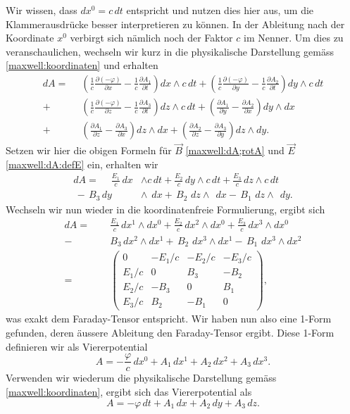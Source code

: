 Wir wissen, dass $dx^0 = c\,dt$ entspricht und nutzen dies hier aus, um die Klammerausdrücke besser interpretieren zu können.
In der Ableitung nach der Koordinate $x^0$ verbirgt sich nämlich noch der Faktor $c$ im Nenner.
Um dies zu veranschaulichen, wechseln wir kurz in die physikalische Darstellung gemäss \eqref{maxwell:koordinaten} und erhalten
\begin{align*}
	dA = \phantom{\frac{1}{c}}
	& \left(\frac{1}{c}\frac{\partial (-\varphi)}{\partial x}-\frac{1}{c}\frac{\partial A_1}{\partial t}\right) dx \wedge c\,dt 
	+ \left(\frac{1}{c}\frac{\partial (-\varphi)}{\partial y}-\frac{1}{c}\frac{\partial A_2}{\partial t}\right) dy \wedge c\,dt 
	\\
	+ &\left(\frac{1}{c}\frac{\partial (-\varphi)}{\partial z}-\frac{1}{c}\frac{\partial A_3}{\partial t}\right) dz \wedge c\,dt
	+ \left(\frac{\partial A_1}{\partial y}-\frac{\partial A_2}{\partial x}\right) dy \wedge dx 
	\\
	+ &\left(\frac{\partial A_1}{\partial z}-\frac{\partial A_3}{\partial x}\right) dz \wedge dx 
	+ \left(\frac{\partial A_2}{\partial z}-\frac{\partial A_3}{\partial y}\right) dz \wedge dy.
\end{align*}
Setzen wir hier die obigen Formeln für $\vec{B}$ \eqref{maxwell:dA;rotA} und $\vec{E}$ \eqref{maxwell:dA:defE} ein, erhalten wir
\begin{align*}
	dA = \phantom{+}
	\frac{E_1}{c} \,dx &\wedge c\,dt +
	\frac{E_2}{c} \,dy \wedge c\,dt +
	\frac{E_3}{c} \,dz \wedge c\,dt
	\\
	\, - \, B_3 \, dy &\wedge \phantom{c}dx +
	\, B_2 \,  \, dz \wedge \phantom{c} dx -
	\, B_1 \, \, dz \wedge \phantom{c} dy.
\end{align*}
Wechseln wir nun wieder in die koordinatenfreie Formulierung, ergibt sich
\begin{align*}
	dA = \phantom{+}
	& \frac{E_1}{c} \,dx^1 \wedge dx^0 +
	\frac{E_2}{c} \,dx^2 \wedge dx^0 +
	\frac{E_3}{c} \,dx^3 \wedge dx^0
	\\
	- \, &B_3 \, dx^2 \wedge dx^1 +
	\, B_2 \, \, dx^3 \wedge dx^1 -
	\, B_1 \, \, dx^3 \wedge dx^2
	\\[2ex] 
	= \quad 
	&\begin{pmatrix}
		0 & -E_1/c & -E_2/c & -E_3/c \\ E_1/c & 0 & B_3 & -B_2 \\ E_2/c & -B_3 & 0 & B_1 \\ E_3/c & B_2 & -B_1 & 0 
	\end{pmatrix},
\end{align*}
was exakt dem Faraday-Tensor entspricht.
Wir haben nun also eine 1-Form gefunden, deren äussere Ableitung den Faraday-Tensor ergibt.
Diese 1-Form definieren wir als Viererpotential
\begin{equation}
	A = -\frac{\varphi}{c}\,dx^0 + A_1 \,dx^1 + A_2 \,dx^2 + A_3 \,dx^3.
\end{equation}
Verwenden wir wiederum die physikalische Darstellung gemäss \eqref{maxwell:koordinaten},
ergibt sich das Viererpotential als
\begin{equation}
	A = -\varphi\,dt + A_1 \,dx + A_2 \,dy + A_3 \,dz.
\end{equation}